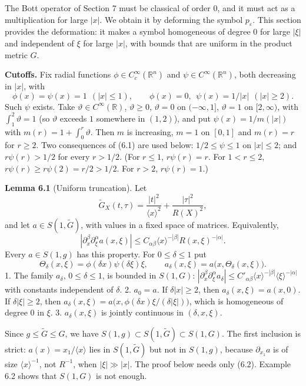 \documentclass[
  11pt,
]{article}
\begin{document}
The Bott operator of Section 7 must be classical of order \(0\), and it
must act as a multiplication for large \(|x|\). We obtain it by
deforming the symbol \(p_\varepsilon\). This section provides the
deformation: it makes a symbol homogeneous of degree \(0\) for large
\(|\xi|\) and independent of \(\xi\) for large \(|x|\), with bounds that
are uniform in the product metric \(G\).

\textbf{Cutoffs.} Fix radial functions
\(\phi\in C_c^\infty(\mathbb R^n)\) and
\(\psi\in C^\infty(\mathbb R^n)\), both decreasing in \(|x|\), with \[
\phi(x)=\psi(x)=1\ \ (|x|\le1),\qquad \phi(x)=0,\ \ \psi(x)=1/|x|\ \ (|x|\ge2).
\tag{6.1}
\] Such \(\psi\) exists. Take \(\vartheta\in C^\infty(\mathbb R)\),
\(\vartheta\ge0\), \(\vartheta=0\) on \((-\infty,1]\), \(\vartheta=1\)
on \([2,\infty)\), with \(\int_1^2\vartheta=1\) (so \(\vartheta\)
exceeds \(1\) somewhere in \((1,2)\)), and put \(\psi(x)=1/m(|x|)\) with
\(m(r)=1+\int_0^r\vartheta\). Then \(m\) is increasing, \(m=1\) on
\([0,1]\) and \(m(r)=r\) for \(r\ge2\). Two consequences of (6.1) are
used below: \(1/2\le\psi\le1\) on \(|x|\le2\); and \(r\psi(r)>1/2\) for
every \(r>1/2\). (For \(r\le1\), \(r\psi(r)=r\). For \(1<r\le2\),
\(r\psi(r)\ge r\psi(2)=r/2>1/2\). For \(r>2\), \(r\psi(r)=1\).)

\textbf{Lemma 6.1} (Uniform truncation). Let \[
\tilde G_X(t,\tau)=\frac{|t|^2}{\langle x\rangle^2}+\frac{|\tau|^2}{R(X)^2},
\] and let \(a\in S(1,\tilde G)\), with values in a fixed space of
matrices. Equivalently, \[
|\partial_x^\beta\partial_\xi^\alpha a(x,\xi)|\le C_{\alpha\beta}\langle x\rangle^{-|\beta|}R(x,\xi)^{-|\alpha|}.
\tag{6.2}
\] Every \(a\in S(1,g)\) has this property. For \(0\le\delta\le1\) put
\[
\Theta_\delta(x,\xi)=\phi(\delta x)\psi(\delta\xi)\xi,\qquad a_\delta(x,\xi)=a\bigl(x,\Theta_\delta(x,\xi)\bigr).
\tag{6.3}
\] 1. The family \(a_\delta\), \(0\le\delta\le1\), is bounded in
\(S(1,G)\):
\(|\partial_x^\beta\partial_\xi^\alpha a_\delta|\le C'_{\alpha\beta}\langle x\rangle^{-|\beta|}\langle\xi\rangle^{-|\alpha|}\)
with constants independent of \(\delta\). 2. \(a_0=a\). If
\(\delta|x|\ge2\), then \(a_\delta(x,\xi)=a(x,0)\). If
\(\delta|\xi|\ge2\), then
\(a_\delta(x,\xi)=a\bigl(x,\phi(\delta x)\xi/(\delta|\xi|)\bigr)\),
which is homogeneous of degree \(0\) in \(\xi\). 3. \(a_\delta(x,\xi)\)
is jointly continuous in \((\delta,x,\xi)\).

Since \(g\le\tilde G\le G\), we have
\(S(1,g)\subset S(1,\tilde G)\subset S(1,G)\). The first inclusion is
strict: \(a(x)=x_1/\langle x\rangle\) lies in \(S(1,\tilde G)\) but not
in \(S(1,g)\), because \(\partial_{x_1}a\) is of size
\(\langle x\rangle^{-1}\), not \(R^{-1}\), when \(|\xi|\gg|x|\). The
proof below needs only (6.2). Example 6.2 shows that \(S(1,G)\) is not
enough.
\end{document}
